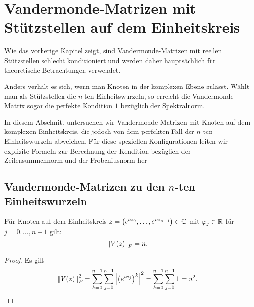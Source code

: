 \chapter{Vandermonde-Matrizen mit Stützstellen auf dem Einheitskreis}

Wie das vorherige Kapitel zeigt, sind Vandermonde-Matrizen mit reellen
Stützstellen schlecht konditioniert und werden daher hauptsächlich für
theoretische Betrachtungen verwendet.

Anders verhält es sich, wenn man Knoten in der komplexen Ebene zulässt.
Wählt man als Stützstellen die $n$-ten Einheitswurzeln, so erreicht die
Vandermonde-Matrix sogar die perfekte Kondition $1$ bezüglich der Spektralnorm.

In diesem Abschnitt untersuchen wir Vandermonde-Matrizen mit Knoten auf dem
komplexen Einheitskreis, die jedoch von dem perfekten Fall der $n$-ten
Einheitswurzeln abweichen.
Für diese speziellen Konfigurationen leiten wir explizite Formeln zur
Berechnung der Kondition bezüglich der Zeilensummennorm und der Frobeniusnorm
her.

\section{Vandermonde-Matrizen zu den \boldmath $n$-ten Einheitswurzeln}

\begin{lemma}
    \label{lemma:frobenius_norm_vandermonde_unit_circle}
    Für Knoten auf dem Einheitskreis
    $z = \left(e^{i \varphi_0}, \dots, e^{i \varphi_{n-1}} \right) \in \mathbb{C}$
    mit $\varphi_j \in \mathbb{R}$ für $j = 0, \dots, n-1$ gilt:
    \begin{equation}
        \left\lVert V \! \left( z \right) \right\rVert_F = n.
    \end{equation}
\end{lemma}
\begin{proof}
    Es gilt
    \[
        \left\lVert V \! \left( z \right) \right\rVert_F^2
        = \sum_{k=0}^{n-1} \sum_{j=0}^{n-1} \left\lvert  \left(e^{i \varphi_j}\right)^k  \right\rvert^2
        = \sum_{k=0}^{n-1} \sum_{j=0}^{n-1} 1
        = n^2.
    \]
\end{proof}


